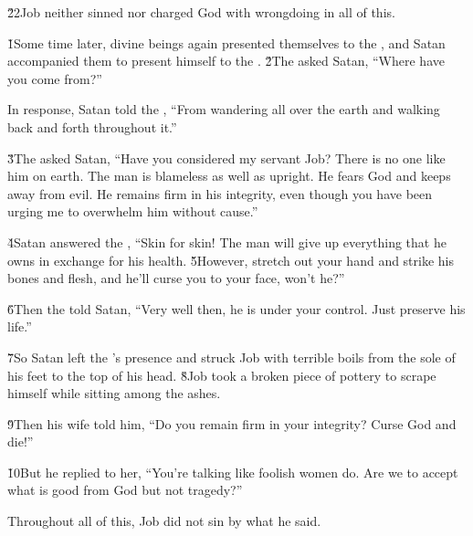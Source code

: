 \v{22}Job neither sinned nor charged God with wrongdoing in all of this.

\v{1}Some time later, divine beings again presented themselves to the , and Satan accompanied them to present himself to the . \v{2}The  asked Satan, ``Where have you come from?''

In response, Satan told the , ``From wandering all over the earth and walking back and forth throughout it.''

\v{3}The  asked Satan, ``Have you considered my servant Job? There is no one like him on earth. The man is blameless as well as upright. He fears God and keeps away from evil. He remains firm in his integrity, even though you have been urging me to overwhelm him without cause.''

\v{4}Satan answered the , ``Skin for skin! The man will give up everything that he owns in exchange for his health. \v{5}However, stretch out your hand and strike his bones and flesh, and he'll curse you to your face, won't he?''

\v{6}Then the  told Satan, ``Very well then, he is under your control. Just preserve his life.''

\v{7}So Satan left the 's presence and struck Job with terrible boils from the sole of his feet to the top of his head. \v{8}Job took a broken piece of pottery to scrape himself while sitting among the ashes.

\v{9}Then his wife told him, ``Do you remain firm in your integrity? Curse God and die!''

\v{10}But he replied to her, ``You're talking like foolish women do. Are we to accept what is good from God but not tragedy?''

Throughout all of this, Job did not sin by what he said.

